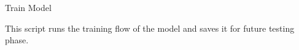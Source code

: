 \begin{section}{Train Model}
    \par This script runs the training flow of the model and saves it for future testing phase.
    
\end{section}
\clearpage